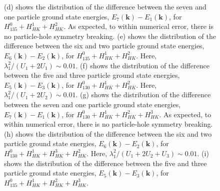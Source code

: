 \documentclass[prb,aps,amssymb,twocolumn,notitlepage]{revtex4-2}
\begin{document}
\begin{figure}
{(d) shows the distribution of the difference between the seven and one particle ground state energies, $E_{7}(\mathbf{k})-E_{1}(\mathbf{k})$, for $H^{0}_{135}+H^{1}_{HK}+H^{2}_{HK}$. 
As expected, to within numerical error, there is no particle-hole symmetry breaking.
(e) shows the distribution of the difference between the six and two particle ground state energies, $E_{6}(\mathbf{k})-E_{2}(\mathbf{k})$, for $H^{0}_{135}+H^{1}_{HK}+H^{2}_{HK}$. 
Here, $\lambda^2_{1}/(U_{1}+2U_{1})\sim 0.01$.
(f) shows the distribution of the difference between the five and three particle ground state energies, $E_{5}(\mathbf{k})-E_{3}(\mathbf{k})$, for $H^{0}_{130}+H^{1}_{HK}+H^{2}_{HK}$. 
Here, $\lambda^2_{1}/(U_{1}+2U_{2})\sim 0.01$.
(g) shows the distribution of the difference between the seven and one particle ground state energies, $E_{7}(\mathbf{k})-E_{1}(\mathbf{k})$, for $H^{0}_{130}+H^{1}_{HK}+H^{2}_{HK}+H^{3}_{HK}$. 
As expected, to within numerical error, there is no particle-hole symmetry breaking.
(h) shows the distribution of the difference between the six and two particle ground state energies, $E_{6}(\mathbf{k})-E_{2}(\mathbf{k})$, for $H^{0}_{130}+H^{1}_{HK}+H^{3}_{HK}+H^{2}_{HK}$. 
Here, $\lambda^2_{1}/(U_{1}+2U_{2}+U_{3})\sim 0.01$.
(i) shows the distribution of the difference between the five and three particle ground state energies, $E_{5}(\mathbf{k})-E_{3}(\mathbf{k})$, for $H^{0}_{135}+H^{1}_{HK}+H^{2}_{HK}+H^{3}_{HK}$. 
}


\label{fig:ParticleHoleBrillouinZone130}
\end{figure}
\end{document}
